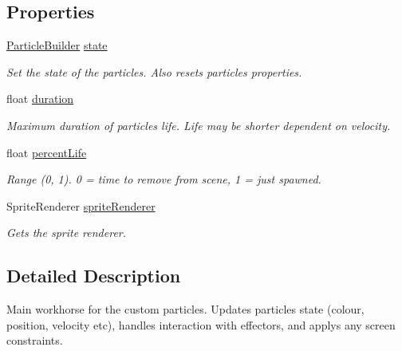 \subsection*{Properties}
\begin{DoxyCompactItemize}
\item 
\hyperlink{struct_p_e2_d_1_1_particle_builder}{Particle\+Builder} \hyperlink{class_p_e2_d_1_1_custom_particle_a70eb3430c0338b4c69e7f90206814e08}{state}
\begin{DoxyCompactList}\small\item\em Set the state of the particles. Also resets particles properties. \end{DoxyCompactList}\item 
float \hyperlink{class_p_e2_d_1_1_custom_particle_abb3aec5eef9b58cf98c6000da1ad732e}{duration}
\begin{DoxyCompactList}\small\item\em Maximum duration of particles life. Life may be shorter dependent on velocity. \end{DoxyCompactList}\item 
float \hyperlink{class_p_e2_d_1_1_custom_particle_ab8a4cc9c8de193c92fecb50634358823}{percent\+Life}
\begin{DoxyCompactList}\small\item\em Range (0, 1). 0 = time to remove from scene, 1 = just spawned. \end{DoxyCompactList}\item 
Sprite\+Renderer \hyperlink{class_p_e2_d_1_1_custom_particle_a6a116a174bdc1007d31528712f19aa7f}{sprite\+Renderer}
\begin{DoxyCompactList}\small\item\em Gets the sprite renderer. \end{DoxyCompactList}\end{DoxyCompactItemize}


\subsection{Detailed Description}
Main workhorse for the custom particles. Updates particles state (colour, position, velocity etc), handles interaction with effectors, and applys any screen constraints. 



